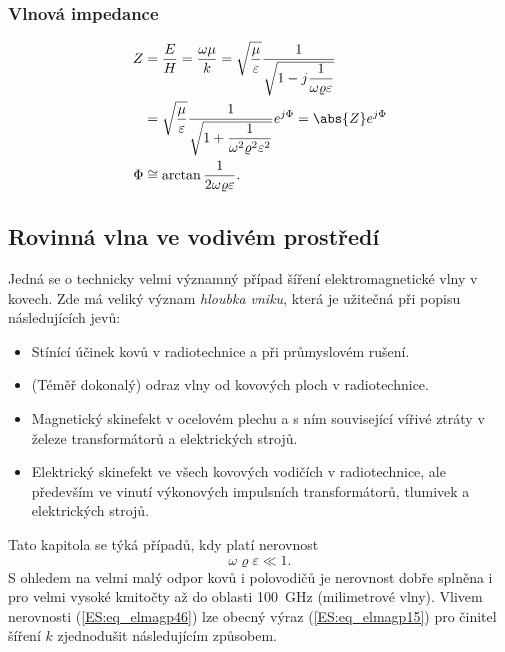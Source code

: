     \subsubsection{Vlnová impedance}
    \begin{subequations}
      \begin{align}
           Z &= \frac{E}{H} = \frac{\omega\mu}{k} 
              = \sqrt{\frac{\mu}{\varepsilon}}                             
                     \frac{1}{\sqrt{1 - j\dfrac{1}{\omega\varrho\varepsilon}}}    \nonumber \\
             &= \sqrt{\frac{\mu}{\varepsilon}}           
                     \frac{1}{\sqrt{1 + 
                        \dfrac{1}{\omega^2\varrho^2\varepsilon^2}}}e^{j\Phi} 
              = \abs{Z}e^{j\Phi}                                   \label{ES:eq_elmagp46a}  \\
        \Phi &\cong \arctan\frac{1}{2\omega\varrho\varepsilon}.    \label{ES:eq_elmagp46b}
    \end{align}
    \end{subequations}

    \subsection{Rovinná vlna ve vodivém prostředí}
      Jedná se o technicky velmi významný případ šíření elektromagnetické vlny v kovech. Zde má 
      veliký význam \emph{hloubka vniku}, která je užitečná při popisu následujících jevů:
      \begin{itemize}[noitemsep]
        \item Stínící účinek kovů v radiotechnice a při průmyslovém rušení.
        \item (Téměř dokonalý) odraz vlny od kovových ploch v radiotechnice.
        \item Magnetický skinefekt v ocelovém plechu a s ním související vířivé ztráty v železe 
              transformátorů a elektrických strojů.
        \item Elektrický skinefekt ve všech kovových vodičích v radiotechnice, ale především ve 
              vinutí výkonových impulsních transformátorů, tlumivek a elektrických strojů.
     \end{itemize}
     Tato kapitola se týká případů, kdy platí nerovnost
     \begin{equation}\label{ES:eq_elmagp46}
       \omega\varrho\varepsilon \ll 1.
     \end{equation}
     S ohledem na velmi malý odpor kovů i polovodičů je nerovnost dobře splněna i pro velmi 
     vysoké kmitočty až do oblasti \qty{100}{\GHz} (milimetrové vlny). Vlivem nerovnosti 
     (\ref{ES:eq_elmagp46}) lze obecný výraz (\ref{ES:eq_elmagp15}) pro činitel šíření \(k\) 
     zjednodušit následujícím způsobem.
     
